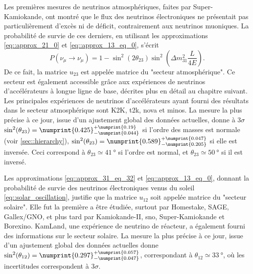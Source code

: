       Les premières mesures de neutrinos atmosphériques, faites par Super-Kamiokande\cite{Fukuda1998}, ont montré que le flux des neutrinos électroniques ne présentait pas particulièrement d'excès ni de déficit, contrairement aux neutrinos muoniques. La probabilité de survie de ces derniers, en utilisant les approximations \eqref{eq::approx_21_0} et \eqref{eq::approx_13_eq_0}, s'écrit
      \begin{equation}\label{eq::mu_approx_atmo}
        P(\nu_{\mu}\to\nu_{\mu}) = 1 - \sin^2(2\theta_{23})\sin^2\left(\Delta m^2_{31}\frac{L}{4E}\right).
      \end{equation}
      De ce fait, la matrice $u_{23}$ est appelée matrice du "secteur atmosphérique". Ce secteur est également accessible grâce aux expériences de neutrinos d'accélérateurs à longue ligne de base, décrites plus en détail au chapitre suivant. Les principales expériences de neutrinos d'accélérateurs ayant fourni des résultats dans le secteur atmosphérique sont K2K\cite{Collaboration2006a}, \gls{t2k}\cite{Abe2018}, \gls{nova}\cite{Adamson2016} et \gls{minos}\cite{Collaboration2014}. La mesure la plus précise à ce jour, issue d'un ajustement global des données actuelles, donne à $3\sigma$ $\sin^2(\theta_{23})=\numprint{0.425}^{+\numprint{0.19}}_{-\numprint{0.044}}$\cite{pdg2018} si l'ordre des masses est normale (voir \autoref{sec::hierarchy}), $\sin^2(\theta_{23})=\numprint{0.589}^{+\numprint{0.047}}_{-\numprint{0.205}}$ si elle est inversée. Ceci correspond à $\theta_{23}\simeq\SI{41}{\degree}$ si l'ordre est normal, et $\theta_{23}\simeq\SI{50}{\degree}$ si il est inversé.

      Les approximations \eqref{eq::approx_31_eq_32} et \eqref{eq::approx_13_eq_0}, donnant la probabilité de survie des neutrinos électroniques venus du soleil \eqref{eq::solar_oscillation}, justifie que la matrice $u_{12}$ soit appelée matrice du "secteur solaire". Elle fut la première a être étudiée, surtout par Homestake\cite{Lande1990}, SAGE\cite{Collaboration2009}, Gallex/GNO\cite{Hampel1999}, et plus tard par  Kamiokande-II\cite{Hirata1992}, \gls{sno}\cite{Aharmim2013}, Super-Kamiokande\cite{Abe2018} et Borexino\cite{Collaboration2013}. KamLand\cite{Collaboration2004}, une expérience de neutrino de réacteur, a également fourni des informations sur le secteur solaire. La mesure la plus précise à ce jour, issue d'un ajustement global des données actuelles donne $\sin^2(\theta_{12})=\numprint{0.297}^{+\numprint{0.057}}_{-\numprint{0.047}}$\cite{pdg2018}, correspondant à $\theta_{12}\simeq\SI{33}{\degree}$, où les incertitudes correspondent à $3\sigma$.

